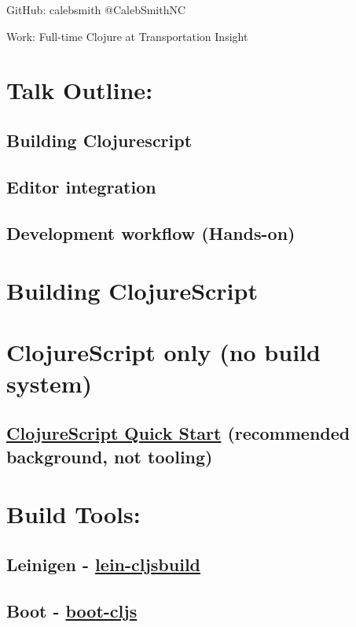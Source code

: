 \documentclass[11pt]{article}
\begin{document}
GitHub: calebsmith
 @CalebSmithNC

Work: Full-time Clojure at Transportation Insight

\section{Talk Outline:}
\label{sec:orgheadline7}
\subsection{Building Clojurescript}
\label{sec:orgheadline4}
\subsection{Editor integration}
\label{sec:orgheadline5}
\subsection{Development workflow (Hands-on)}
\label{sec:orgheadline6}

\section{Building ClojureScript}
\label{sec:orgheadline8}

\section{ClojureScript only (no build system)}
\label{sec:orgheadline10}
\subsection{\href{https://github.com/clojure/clojurescript/wiki/Quick-Start}{ClojureScript Quick Start} (recommended background, not tooling)}
\label{sec:orgheadline9}

\section{Build Tools:}
\label{sec:orgheadline13}
\subsection{Leinigen - \href{https://github.com/emezeske/lein-cljsbuild}{lein-cljsbuild}}
\label{sec:orgheadline11}
\subsection{Boot - \href{https://github.com/adzerk-oss/boot-cljs}{boot-cljs}}
\label{sec:orgheadline12}
\end{document}
